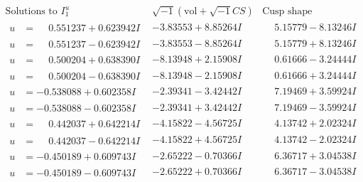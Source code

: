 \documentclass[1p]{elsarticle_modified}
\theoremstyle{definition}
\newcommand{\I}{\sqrt{-1}}
\begin{document}
$$\begin{array}{c|c|c}  
\text{Solutions to }I^u_{1}& \I (\text{vol} + \sqrt{-1}CS) & \text{Cusp shape}\\
 \hline 
\begin{aligned}
u &= \phantom{-}0.551237 + 0.623942 I\end{aligned}
 & -3.83553 + 8.85264 I & \phantom{-}5.15779 - 8.13246 I \\ \hline\begin{aligned}
u &= \phantom{-}0.551237 - 0.623942 I\end{aligned}
 & -3.83553 - 8.85264 I & \phantom{-}5.15779 + 8.13246 I \\ \hline\begin{aligned}
u &= \phantom{-}0.500204 + 0.638390 I\end{aligned}
 & -8.13948 + 2.15908 I & \phantom{-}0.61666 - 3.24444 I \\ \hline\begin{aligned}
u &= \phantom{-}0.500204 - 0.638390 I\end{aligned}
 & -8.13948 - 2.15908 I & \phantom{-}0.61666 + 3.24444 I \\ \hline\begin{aligned}
u &= -0.538088 + 0.602358 I\end{aligned}
 & -2.39341 - 3.42442 I & \phantom{-}7.19469 + 3.59924 I \\ \hline\begin{aligned}
u &= -0.538088 - 0.602358 I\end{aligned}
 & -2.39341 + 3.42442 I & \phantom{-}7.19469 - 3.59924 I \\ \hline\begin{aligned}
u &= \phantom{-}0.442037 + 0.642214 I\end{aligned}
 & -4.15822 - 4.56725 I & \phantom{-}4.13742 + 2.02324 I \\ \hline\begin{aligned}
u &= \phantom{-}0.442037 - 0.642214 I\end{aligned}
 & -4.15822 + 4.56725 I & \phantom{-}4.13742 - 2.02324 I \\ \hline\begin{aligned}
u &= -0.450189 + 0.609743 I\end{aligned}
 & -2.65222 - 0.70366 I & \phantom{-}6.36717 + 3.04538 I \\ \hline\begin{aligned}
u &= -0.450189 - 0.609743 I\end{aligned}
 & -2.65222 + 0.70366 I & \phantom{-}6.36717 - 3.04538 I \\ \hline\begin{aligned}

\end{aligned}
\end{array}$$
\end{document}
